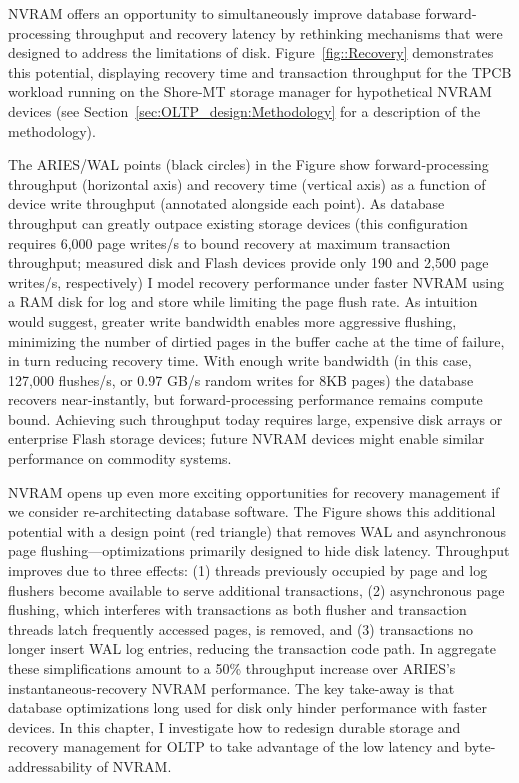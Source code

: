 NVRAM offers an opportunity to simultaneously improve database forward-processing throughput and recovery latency by rethinking mechanisms that were designed to address the limitations of disk.
Figure~\ref{fig::Recovery} demonstrates this potential, displaying recovery time and transaction throughput for the TPCB workload running on the Shore-MT storage manager \cite{JohnsonPandis09} for hypothetical NVRAM devices (see Section~\ref{sec:OLTP_design:Methodology} for a description of the methodology).



The ARIES/WAL points (black circles) in the Figure show forward-processing throughput (horizontal axis) and recovery time (vertical axis) as a function of device write throughput (annotated alongside each point).
As database throughput can greatly outpace existing storage devices (this configuration requires 6,000 page writes/s to bound recovery at maximum transaction throughput; measured disk and Flash devices provide only 190 and 2,500 page writes/s, respectively) I model recovery performance under faster NVRAM using a RAM disk for log and store while limiting the page flush rate.
As intuition would suggest, greater write bandwidth enables more aggressive flushing, minimizing the number of dirtied pages in the buffer cache at the time of failure, in turn reducing recovery time.
With enough write bandwidth (in this case, 127,000 flushes/s, or 0.97 GB/s random writes for 8KB pages) the database recovers near-instantly, but forward-processing performance remains compute bound.
Achieving such throughput today requires large, expensive disk arrays or enterprise Flash storage devices; future NVRAM devices might enable similar performance on commodity systems.

NVRAM opens up even more exciting opportunities for recovery management if we consider re-architecting database software.
The Figure shows this additional potential with a design point (red triangle) that removes WAL and asynchronous page flushing---optimizations primarily designed to hide disk latency.
Throughput improves due to three effects: (1) threads previously occupied by page and log flushers become available to serve additional transactions, (2) asynchronous page flushing, which interferes with transactions as both flusher and transaction threads latch frequently accessed pages, is removed, and (3) transactions no longer insert WAL log entries, reducing the transaction code path.
In aggregate these simplifications amount to a 50\% throughput increase over ARIES's instantaneous-recovery NVRAM performance.
The key take-away is that database optimizations long used for disk only hinder performance with faster devices.
In this chapter, I investigate how to redesign durable storage and recovery management for OLTP to take advantage of the low latency and byte-addressability of NVRAM.

